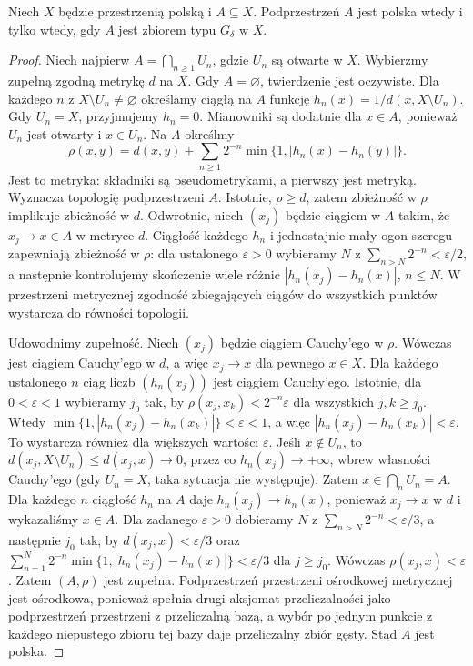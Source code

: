 \begin{twierdzenie}
\label{thm:topog-polskie-gdelta}
Niech $X$ będzie przestrzenią polską
i $A\subseteq X$. Podprzestrzeń
$A$ jest polska wtedy i tylko wtedy,
gdy $A$ jest zbiorem typu $G_\delta$
w $X$.
\end{twierdzenie}
\begin{proof}
Niech najpierw
$A=\bigcap_{n\ge1}U_n$,
gdzie $U_n$ są otwarte w $X$.
Wybierzmy zupełną zgodną metrykę
$d$ na $X$. Gdy $A=\varnothing$,
twierdzenie jest oczywiste.
Dla każdego $n$ z
$X\setminus U_n\ne\varnothing$
określamy ciągłą na $A$ funkcję
$h_n(x)=1/d(x,X\setminus U_n)$.
Gdy $U_n=X$, przyjmujemy $h_n=0$.
Mianowniki są dodatnie dla
$x\in A$, ponieważ $U_n$ jest
otwarty i $x\in U_n$.
Na $A$ określmy
\[
\rho(x,y)=d(x,y)+
\sum_{n\ge1}2^{-n}
\min\{1,|h_n(x)-h_n(y)|\}.
\]
Jest to metryka: składniki
są pseudometrykami, a pierwszy
jest metryką. Wyznacza
topologię podprzestrzeni $A$.
Istotnie, $\rho\ge d$, zatem
zbieżność w $\rho$ implikuje
zbieżność w $d$.
Odwrotnie, niech $(x_j)$ będzie
ciągiem w $A$ takim, że
$x_j\to x\in A$ w metryce $d$.
Ciągłość każdego $h_n$ i
jednostajnie mały ogon szeregu
zapewniają zbieżność w $\rho$:
dla ustalonego $\varepsilon>0$
wybieramy $N$ z
$\sum_{n>N}2^{-n}<\varepsilon/2$,
a następnie kontrolujemy
skończenie wiele różnic
$|h_n(x_j)-h_n(x)|$, $n\le N$.
W przestrzeni metrycznej
zgodność zbiegających ciągów
do wszystkich punktów wystarcza
do równości topologii.

Udowodnimy zupełność.
Niech $(x_j)$ będzie ciągiem
Cauchy'ego w $\rho$.
Wówczas jest ciągiem Cauchy'ego
w $d$, a więc $x_j\to x$
dla pewnego $x\in X$.
Dla każdego ustalonego $n$
ciąg liczb $(h_n(x_j))$
jest ciągiem Cauchy'ego.
Istotnie, dla
$0<\varepsilon<1$ wybieramy
$j_0$ tak, by
$\rho(x_j,x_k)<2^{-n}\varepsilon$
dla wszystkich $j,k\ge j_0$.
Wtedy
$\min\{1,|h_n(x_j)-h_n(x_k)|\}
<\varepsilon<1$,
a więc
$|h_n(x_j)-h_n(x_k)|<\varepsilon$.
To wystarcza również dla
większych wartości $\varepsilon$.
Jeśli $x\notin U_n$,
to $d(x_j,X\setminus U_n)
\le d(x_j,x)\to0$, przez co
$h_n(x_j)\to+\infty$,
wbrew własności Cauchy'ego
(gdy $U_n=X$, taka sytuacja
nie występuje).
Zatem $x\in\bigcap_n U_n=A$.
Dla każdego $n$ ciągłość
$h_n$ na $A$ daje
$h_n(x_j)\to h_n(x)$,
ponieważ $x_j\to x$ w $d$
i wykazaliśmy $x\in A$.
Dla zadanego $\varepsilon>0$
dobieramy $N$ z
$\sum_{n>N}2^{-n}<\varepsilon/3$,
a następnie $j_0$ tak, by
$d(x_j,x)<\varepsilon/3$
oraz
$\sum_{n=1}^N2^{-n}
\min\{1,|h_n(x_j)-h_n(x)|\}
<\varepsilon/3$
dla $j\ge j_0$.
Wówczas $\rho(x_j,x)<\varepsilon$.
Zatem $(A,\rho)$ jest zupełna.
Podprzestrzeń przestrzeni ośrodkowej
metrycznej jest ośrodkowa,
ponieważ spełnia drugi aksjomat
przeliczalności jako podprzestrzeń
przestrzeni z przeliczalną bazą,
a wybór po jednym punkcie z
każdego niepustego zbioru tej bazy
daje przeliczalny zbiór gęsty.
Stąd $A$ jest polska.


\end{proof}
